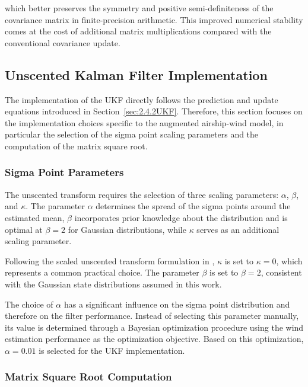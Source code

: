 which better preserves the symmetry and positive semi-definiteness of the covariance matrix in finite-precision arithmetic. This improved numerical stability comes at the cost of additional matrix multiplications compared with the conventional covariance update.





\subsection{Unscented Kalman Filter Implementation}
\label{sec:3.1.6UKFImplementation}

The implementation of the UKF directly follows the prediction and update equations introduced in Section~\ref{sec:2.4.2UKF}. Therefore, this section focuses on the implementation choices specific to the augmented airship-wind model, in particular the selection of the sigma point scaling parameters and the computation of the matrix square root.


\subsubsection{Sigma Point Parameters}

The unscented transform requires the selection of three scaling parameters: $\alpha$, $\beta$, and $\kappa$. The parameter $\alpha$ determines the spread of the sigma points around the estimated mean, $\beta$ incorporates prior knowledge about the distribution and is optimal at $\beta=2$ for Gaussian distributions, while $\kappa$ serves as an additional scaling parameter.

Following the scaled unscented transform formulation in \cite{Julier2004Unscented}, $\kappa$ is set to $\kappa=0$, which represents a common practical choice. The parameter $\beta$ is set to $\beta=2$, consistent with the Gaussian state distributions assumed in this work.

The choice of $\alpha$ has a significant influence on the sigma point distribution and therefore on the filter performance. Instead of selecting this parameter manually, its value is determined through a Bayesian optimization procedure \cite{Snoek2012Bayesian} using the wind estimation performance as the optimization objective. Based on this optimization, $\alpha=0.01$ is selected for the UKF implementation.





\subsubsection{Matrix Square Root Computation}

